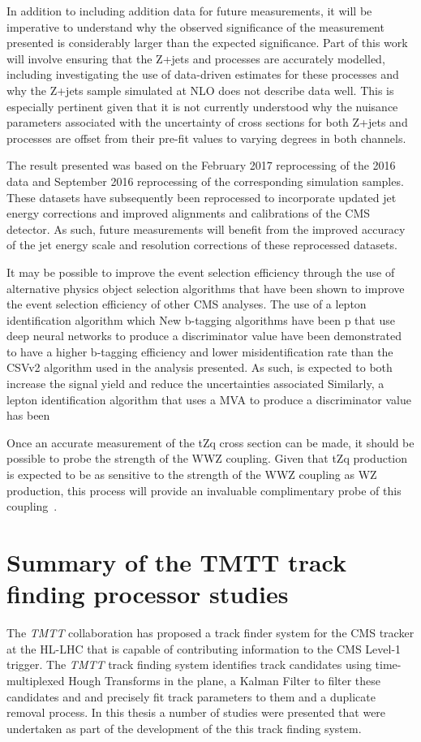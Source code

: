 In addition to including addition data for future measurements, it will be imperative to understand why the observed significance of the measurement presented is considerably larger than the expected significance.
Part of this work will involve ensuring that the Z+jets and \ttbar processes are accurately modelled, including investigating the use of data-driven estimates for these processes and why the Z+jets sample simulated at NLO does not describe data well.
This is especially pertinent given that it is not currently understood why the nuisance parameters associated with the uncertainty of cross sections for both Z+jets and \ttbar processes are offset from their pre-fit values to varying degrees in both channels.

The result presented was based on the February 2017 reprocessing of the 2016 data and September 2016 reprocessing of the corresponding simulation samples.
These datasets have subsequently been reprocessed to incorporate updated jet energy corrections and improved alignments and calibrations of the CMS detector.
As such, future measurements will benefit from the improved accuracy of the jet energy scale and resolution corrections of these reprocessed datasets.

It may be possible to improve the event selection efficiency through the use of alternative physics object selection algorithms that have been shown to improve the event selection efficiency of other CMS analyses.
The use of a lepton identification algorithm which 
New b-tagging algorithms have been p
that use deep neural networks to produce a discriminator value have been demonstrated to have a higher b-tagging efficiency and lower misidentification rate than the CSVv2 algorithm used in the analysis presented.
As such, is expected to both increase the signal yield and reduce the uncertainties associated 
Similarly, a lepton identification algorithm that uses a MVA to produce a discriminator value has been 


Once an accurate measurement of the tZq cross section can be made, it should be possible to probe the strength of the WWZ coupling.
Given that tZq production is expected to be as sensitive to the strength of the WWZ coupling as WZ production, this process will provide an invaluable complimentary probe of this coupling~\cite{Campbell:2013yla}.

\section{Summary of the TMTT track finding processor studies}
The \emph{TMTT} collaboration has proposed a track finder system for the CMS tracker at the HL-LHC that is capable of contributing information to the CMS Level-1 trigger.
The \emph{TMTT} track finding system identifies track candidates using time-multiplexed Hough Transforms in the \rphi plane, a Kalman Filter to filter these candidates and and precisely fit track parameters to them and a duplicate removal process.
In this thesis a number of studies were presented that were undertaken as part of the development of the this track finding system.

